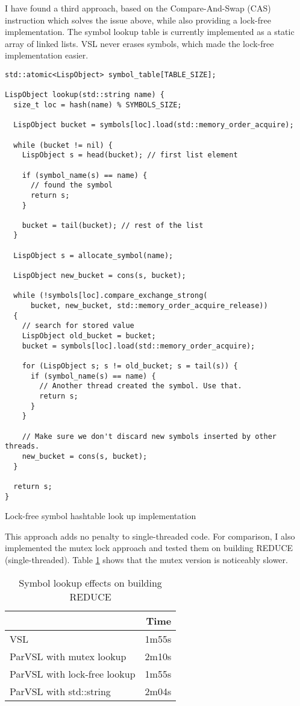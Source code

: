 I have found a third approach, based on the Compare-And-Swap (CAS) instruction which solves the issue
above, while also providing a lock-free implementation. The symbol lookup table is currently implemented
as a static array of linked lists. VSL never erases symbols, which made the lock-free implementation easier.

\begin{code}
\begin{verbatim}
std::atomic<LispObject> symbol_table[TABLE_SIZE];

LispObject lookup(std::string name) {
  size_t loc = hash(name) % SYMBOLS_SIZE;

  LispObject bucket = symbols[loc].load(std::memory_order_acquire);

  while (bucket != nil) {
    LispObject s = head(bucket); // first list element

    if (symbol_name(s) == name) {
      // found the symbol
      return s;
    }

    bucket = tail(bucket); // rest of the list
  }

  LispObject s = allocate_symbol(name);

  LispObject new_bucket = cons(s, bucket);

  while (!symbols[loc].compare_exchange_strong(
      bucket, new_bucket, std::memory_order_acquire_release))
  {
    // search for stored value
    LispObject old_bucket = bucket;
    bucket = symbols[loc].load(std::memory_order_acquire);

    for (LispObject s; s != old_bucket; s = tail(s)) {
      if (symbol_name(s) == name) {
        // Another thread created the symbol. Use that.
        return s;
      }
    }

    // Make sure we don't discard new symbols inserted by other threads.
    new_bucket = cons(s, bucket);
  }

  return s;
}
\end{verbatim}
\caption{Lock-free symbol hashtable look up implementation}
\label{code:lockfree}
\end{code}

This approach adds no penalty to single-threaded
code. For comparison, I also implemented the mutex lock approach and tested
them on building REDUCE (single-threaded). Table \ref{tab:lockfree} shows that the mutex
version is noticeably slower.

\begin{table}[H]
  \centering
  \begin{tabular}{lr}
                               & Time \\
  \hline
  VSL                          & 1m55s \\
  ParVSL with mutex lookup     & 2m10s \\
  ParVSL with lock-free lookup & 1m55s \\
  ParVSL with std::string      & 2m04s
  \end{tabular}
  \caption{Symbol lookup effects on building REDUCE}
  \label{tab:lockfree}
\end{table}

